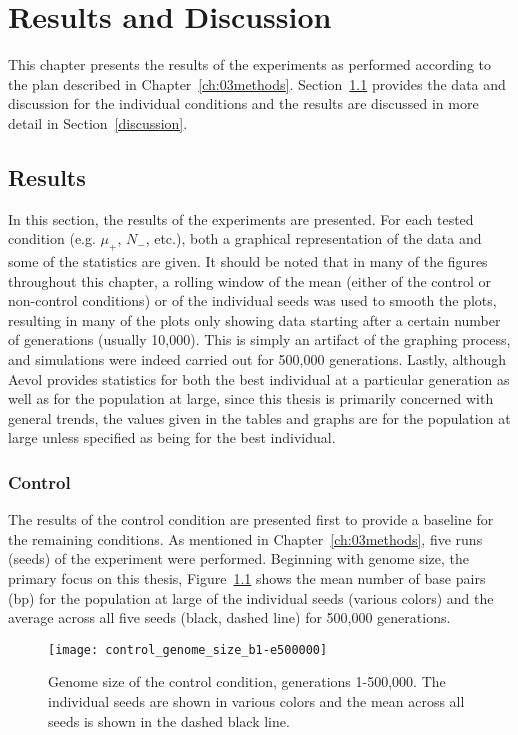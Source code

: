 \chapter{Results and Discussion}\label{ch:04results_discussion}

This chapter presents the results of the experiments as performed according to the plan described in Chapter~\ref{ch:03methods}. Section~\ref{results} provides the data and discussion for the individual conditions and the results are discussed in more detail in Section~\ref{discussion}. 

\section{Results}\label{results}
In this section, the results of the experiments are presented. For each tested condition (e.g. $\mu_+$, $N_-$, etc.), both a graphical representation of the data and some of the statistics are given. It should be noted that in many of the figures throughout this chapter, a rolling window of the mean (either of the control or non-control conditions) or of the individual seeds was used to smooth the plots, resulting in many of the plots only showing data starting after a certain number of generations (usually 10,000). This is simply an artifact of the graphing process, and simulations were indeed carried out for 500,000 generations. Lastly, although Aevol provides statistics for both the best individual at a particular generation as well as for the population at large, since this thesis is primarily concerned with general trends, the values given in the tables and graphs are for the population at large unless specified as being for the best individual. 
\subsection{Control}
The results of the control condition are presented first to provide a baseline for the remaining conditions. As mentioned in Chapter~\ref{ch:03methods}, five runs (seeds) of the experiment were performed. Beginning with genome size, the primary focus on this thesis, Figure~\ref{fig:control_genome_size} shows the mean number of base pairs (bp) for the population at large of the individual seeds (various colors) and the average across all five seeds (black, dashed line) for 500,000 generations. 

\begin{figure}[H]
	\centering
	\texttt{[image: control\_genome\_size\_b1-e500000]}
	\caption[Control genome size, all seeds]{Genome size of the control condition, generations 1-500,000. The individual seeds are shown in various colors and the mean across all seeds is shown in the dashed black line.}
	\label{fig:control_genome_size}
\end{figure}

